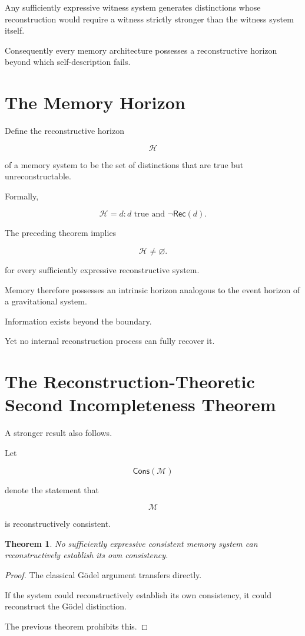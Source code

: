 \documentclass[12pt,oneside]{book}
\theoremstyle{plain} \newtheorem{theorem}{Theorem}[chapter] \newtheorem{lemma}[theorem]{Lemma} \newtheorem{proposition}[theorem]{Proposition} \newtheorem{corollary}[theorem]{Corollary}
\theoremstyle{definition} \newtheorem{definition}[theorem]{Definition} \newtheorem{axiom}[theorem]{Axiom} \newtheorem{construction}[theorem]{Construction}
\theoremstyle{remark} \newtheorem{remark}[theorem]{Remark} \newtheorem{example}[theorem]{Example}
\begin{document}
Any sufficiently expressive witness system generates distinctions whose reconstruction would require a witness strictly stronger than the witness system itself.

Consequently every memory architecture possesses a reconstructive horizon beyond which self-description fails.

\section{The Memory Horizon}

Define the reconstructive horizon

\[
\mathcal H
\]

of a memory system to be the set of distinctions that are true but unreconstructable.

Formally,

\[
\mathcal H
=
{
d :
d \text{ true and }
\neg\mathsf{Rec}(d)
}.
\]

The preceding theorem implies

\[
\mathcal H
\neq
\varnothing.
\]

for every sufficiently expressive reconstructive system.

Memory therefore possesses an intrinsic horizon analogous to the event horizon of a gravitational system.

Information exists beyond the boundary.

Yet no internal reconstruction process can fully recover it.

\section{The Reconstruction-Theoretic Second Incompleteness Theorem}

A stronger result also follows.

Let

\[
\mathsf{Cons}(\mathcal M)
\]

denote the statement that

\[
\mathcal M
\]

is reconstructively consistent.

\begin{theorem}

No sufficiently expressive consistent memory system can reconstructively establish its own consistency.

\end{theorem}

\begin{proof}

The classical Gödel argument transfers directly.

If the system could reconstructively establish its own consistency, it could reconstruct the Gödel distinction.

The previous theorem prohibits this.

\end{proof}
\end{document}
